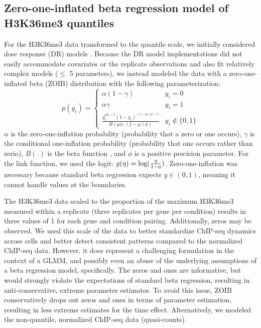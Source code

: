 \documentclass[11pt]{biorxiv}
\begin{document}
\subsection{Zero-one-inflated beta regression model of H3K36me3 quantiles}
For the H3K36me3 data transformed to the quantile scale, we initially considered dose response (DR) models \citep{Slob2002, Wilson2014}. Because the DR model implementations did not easily accommodate covariates or the replicate observations and also fit relatively complex models ($\le$ 5 parameters), we instead modeled the data with a zero-one-inflated beta (ZOIB) distribution with the following parameterization:
\begin{equation}
	p(y_{i}) = \begin{cases} 
      			\alpha(1 - \gamma) & y_{i} = 0 \\
      			\alpha \gamma & y_{i} = 1 \\
     			 \frac{y_{i}^{\mu\phi - 1}(1 - y_{i})^{(1 - \mu)\phi - 1}}{B(\mu \phi, (1 - \mu)\phi)} & y_{i} \not\in \{0, 1\}
   		\end{cases}
\end{equation}
$\alpha$ is the zero-one-inflation probability (probability that a zero or one occurs), $\gamma$ is the conditional one-inflation probability (probability that one occurs rather than zerio), $B(.)$ is the beta function \citep{Casella2002}, and $\phi$ is a positive precision parameter. For the link function, we used the logit: $g(\eta)= \log\large(\frac{\eta}{1 - \eta}\large)$. Zero-one-inflation was necessary because standard beta regression expects $y \in (0, 1)$, meaning it cannot handle values at the boundaries.

The H3K36me3 data scaled to the proportion of the maximum H3K36me3 measured within a replicate (three replicates per gene per condition) results in three values of 1 for each gene and condition pairing. Additionally, zeros may be observed. We used this scale of the data to better standardize ChIP-seq dynamics across cells and better detect consistent patterns compared to the normalized ChIP-seq data. However, it does represent a challenging formulation in the context of a GLMM, and possibly even an abuse of the underlying assumptions of a beta regression model, specifically. The zeros and ones are informative, but would strongly violate the expectations of standard beta regression, resulting in anti-conservative, extreme parameter estimates. To avoid this issue, ZOIB conservatively drops out zeros and ones in terms of parameter estimation, resulting in less extreme estimates for the time effect. Alternatively, we modeled the non-quantile, normalized ChIP-seq data (quasi-counts).
\end{document}
